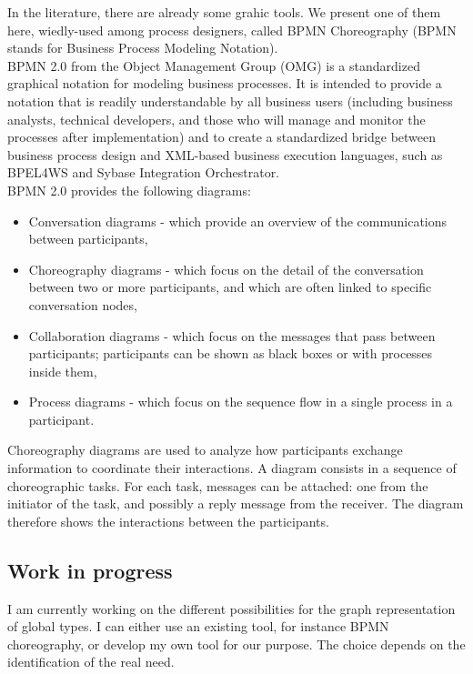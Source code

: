 \documentclass{article}
\begin{document}
In the literature, there are already some grahic tools. We present one of them here, wiedly-used among process designers, called BPMN Choreography (BPMN stands for Business Process Modeling Notation). \\
BPMN 2.0 from the Object Management Group (OMG) is a standardized graphical notation for modeling business processes. It is intended to provide a notation that is readily understandable by all business users (including business analysts, technical developers, and those who will manage and monitor the processes after implementation) and to create a standardized bridge between business process design and XML-based business execution languages, such as BPEL4WS and Sybase Integration Orchestrator.\\
BPMN 2.0 provides the following diagrams:
\begin{itemize}
\item Conversation diagrams - which provide an overview of the communications between participants,
\item Choreography diagrams - which focus on the detail of the conversation between two or more participants, and which are often linked to specific conversation nodes,
\item Collaboration diagrams - which focus on the messages that pass between participants; participants can be shown as black boxes or with processes inside them,
\item Process diagrams - which focus on the sequence flow in a single process in a participant. 
\end{itemize}

Choreography diagrams are used to analyze how participants exchange information to coordinate their interactions. A diagram consists in a sequence of choreographic tasks. For each task, messages can be attached: one from the initiator of the task, and possibly a reply message from the receiver. The diagram therefore shows the interactions between the participants.

\subsection{Work in progress}

I am currently working on the different possibilities for the graph representation of global types. I can either use an existing tool, for instance BPMN choreography, or develop my own tool for our purpose. The choice depends on the identification of the real need.
\end{document}
